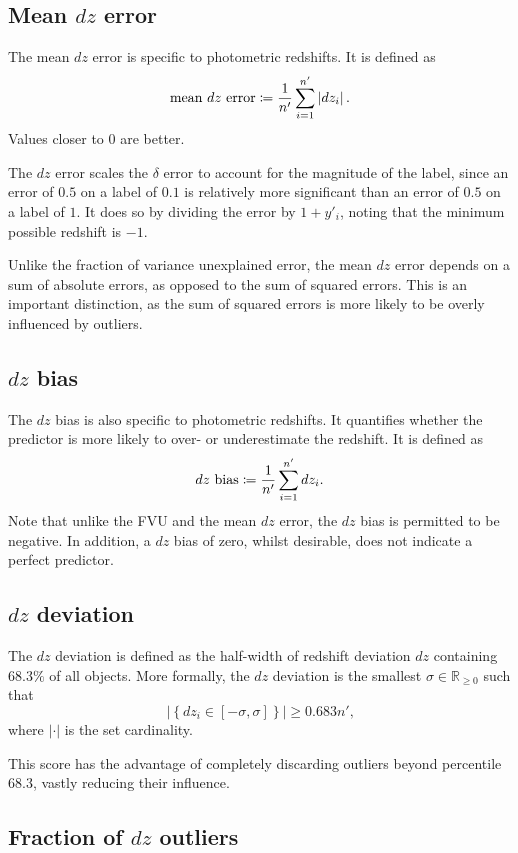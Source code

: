 \documentclass[11pt,twoside]{report}
\newcommand\bbR{\mathbb{R}}
\newcommand\abs[1]{\left|#1\right|}
\begin{document}
\subsection{Mean $dz$ error}

The mean $dz$ error is specific to photometric redshifts. It is defined as \[
  \textrm{mean $dz$ error} \coloneqq \frac{1}{n'}\sum_{i=1}^{n'} \abs{dz_i} \text.
\] Values closer to $0$ are better.

The $dz$ error scales the $\delta$ error to account for the magnitude of the label, since an error of $0.5$ on a label of $0.1$ is relatively more significant than an error of $0.5$ on a label of $1$. It does so by dividing the error by $1 + y'_i$, noting that the minimum possible redshift is $-1$.

Unlike the fraction of variance unexplained error, the mean $dz$ error depends on a sum of absolute errors, as opposed to the sum of squared errors. This is an important distinction, as the sum of squared errors is more likely to be overly influenced by outliers.

\subsection{$dz$ bias}

The $dz$ bias is also specific to photometric redshifts. It quantifies whether the predictor is more likely to over- or underestimate the redshift. It is defined as\[
  \textrm{$dz$ bias} \coloneqq \frac{1}{n'}\sum_{i=1}^{n'} dz_i \text.
\] Note that unlike the FVU and the mean $dz$ error, the $dz$ bias is permitted to be negative. In addition, a $dz$ bias of zero, whilst desirable, does not indicate a perfect predictor.

\subsection{$dz$ deviation}

The $dz$ deviation is defined as the half-width of redshift deviation $dz$ containing $68.3\%$ of all objects. More formally, the $dz$ deviation is the smallest $\sigma \in \bbR_{\geq0}$ such that\[
  \abs{\left\{ dz_i \in [-\sigma, \sigma]\right\}} \geq 0.683n'\text{,}
\] where $\abs{\cdot}$ is the set cardinality.

This score has the advantage of completely discarding outliers beyond percentile $68.3$, vastly reducing their influence.

\subsection{Fraction of $dz$ outliers}
\end{document}
